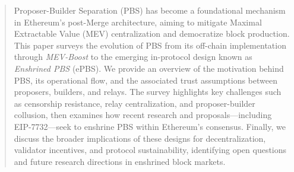 \maketitle

\begin{abstract}
Proposer-Builder Separation (PBS) has become a foundational mechanism in Ethereum’s post-Merge architecture, aiming to mitigate Maximal Extractable Value (MEV) centralization and democratize block production. This paper surveys the evolution of PBS from its off-chain implementation through \emph{MEV-Boost} to the emerging in-protocol design known as \emph{Enshrined PBS} (ePBS). We provide an overview of the motivation behind PBS, its operational flow, and the associated trust assumptions between proposers, builders, and relays. The survey highlights key challenges such as censorship resistance, relay centralization, and proposer-builder collusion, then examines how recent research and proposals—including EIP-7732—seek to enshrine PBS within Ethereum’s consensus. Finally, we discuss the broader implications of these designs for decentralization, validator incentives, and protocol sustainability, identifying open questions and future research directions in enshrined block markets.
\end{abstract}